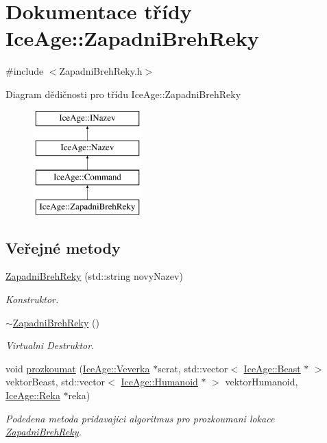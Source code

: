 \hypertarget{classIceAge_1_1ZapadniBrehReky}{}\section{Dokumentace třídy Ice\+Age\+:\+:Zapadni\+Breh\+Reky}
\label{classIceAge_1_1ZapadniBrehReky}


{\ttfamily \#include $<$Zapadni\+Breh\+Reky.\+h$>$}

Diagram dědičnosti pro třídu Ice\+Age\+:\+:Zapadni\+Breh\+Reky\begin{figure}[H]
\begin{center}
\leavevmode
\includegraphics[height=4.000000cm]{d0/da1/classIceAge_1_1ZapadniBrehReky}
\end{center}
\end{figure}
\subsection*{Veřejné metody}
\begin{DoxyCompactItemize}
\item 
\hyperlink{classIceAge_1_1ZapadniBrehReky_a6dd8484635c7a223f40920049350f832}{Zapadni\+Breh\+Reky} (std\+::string novy\+Nazev)
\begin{DoxyCompactList}\small\item\em Konstruktor. \end{DoxyCompactList}\item 
\hyperlink{classIceAge_1_1ZapadniBrehReky_a00e86d8cc5275a89beba1612f6075bd6}{$\sim$\+Zapadni\+Breh\+Reky} ()
\begin{DoxyCompactList}\small\item\em Virtualni Destruktor. \end{DoxyCompactList}\item 
void \hyperlink{classIceAge_1_1ZapadniBrehReky_a656271d79b585a10278692815523558c}{prozkoumat} (\hyperlink{classIceAge_1_1Veverka}{Ice\+Age\+::\+Veverka} $\ast$scrat, std\+::vector$<$ \hyperlink{classIceAge_1_1Beast}{Ice\+Age\+::\+Beast} $\ast$ $>$ vektor\+Beast, std\+::vector$<$ \hyperlink{classIceAge_1_1Humanoid}{Ice\+Age\+::\+Humanoid} $\ast$ $>$ vektor\+Humanoid, \hyperlink{classIceAge_1_1Reka}{Ice\+Age\+::\+Reka} $\ast$reka)
\begin{DoxyCompactList}\small\item\em Podedena metoda pridavajici algoritmus pro prozkoumani lokace \hyperlink{classIceAge_1_1ZapadniBrehReky}{Zapadni\+Breh\+Reky}. \end{DoxyCompactList}\end{DoxyCompactItemize}
